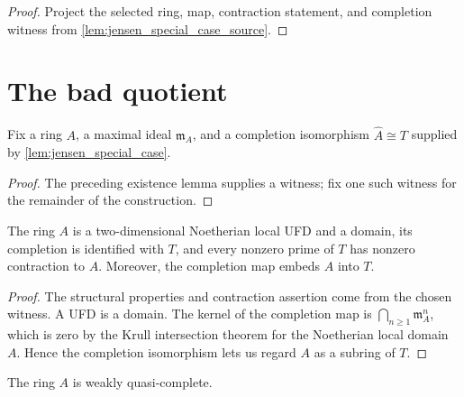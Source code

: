 \begin{proof}
  Project the selected ring, map, contraction statement, and completion witness
  from \cref{lem:jensen_special_case_source}.
\end{proof}

\section{The bad quotient}

\begin{definition}
  \label{def:counterexample_ring}
  Fix a ring \(A\), a maximal ideal \(\mathfrak m_A\), and a completion
  isomorphism \(\widehat A\cong T\) supplied by
  \cref{lem:jensen_special_case}.
\end{definition}

\begin{proof}
  The preceding existence lemma supplies a witness; fix one such witness for
  the remainder of the construction.
\end{proof}

\begin{lemma}
  \label{lem:counterexample_ring_properties}
  The ring \(A\) is a two-dimensional Noetherian local UFD and a domain, its
  completion is identified with \(T\), and every nonzero prime of \(T\) has
  nonzero contraction to \(A\).  Moreover, the completion map embeds \(A\)
  into \(T\).
\end{lemma}

\begin{proof}
  The structural properties and contraction assertion come from the chosen
  witness.  A UFD is a domain.  The kernel of the completion map is
  \(\bigcap_{n\geq1}\mathfrak m_A^n\), which is zero by the Krull intersection
  theorem for the Noetherian local domain \(A\).  Hence the completion
  isomorphism lets us regard \(A\) as a subring of \(T\).
\end{proof}

\begin{lemma}
  \label{lem:counterexample_ring_weak}
  The ring \(A\) is weakly quasi-complete.
\end{lemma}


